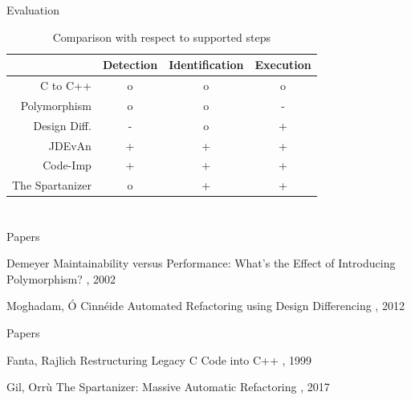 \documentclass{beamer}
\begin{document}
\begin{frame}{Evaluation}
  \begin{table}[htb]
    \centering
    \caption{Comparison with respect to supported steps}
    \label{tbl:steps}
    \begin{tabular}{r|ccc}
      ~               & Detection & Identification  & Execution \\ \hline
      C to C++        & o         & o               & o \\
      Polymorphism    & o         & o               & - \\
      Design Diff.    & -         & o               & + \\
      JDEvAn          & +         & +               & + \\
      Code-Imp        & +         & +               & + \\
      The Spartanizer & o         & +               & + \\
    \end{tabular}
  \end{table}
\end{frame}

\appendix
\section*{\appendixname}

\begin{frame}{Papers}
  \begin{thebibliography}{10}
    \beamertemplatearticlebibitems
    
      Demeyer
      \newblock Maintainability versus Performance: What's the Effect of Introducing Polymorphism?
      , 2002
    
      Moghadam, Ó Cinnéide
      \newblock Automated Refactoring using Design Differencing
      , 2012
  \end{thebibliography}
\end{frame}

\begin{frame}{Papers}
  \begin{thebibliography}{10}
    \beamertemplatearticlebibitems
    
      Fanta, Rajlich
      \newblock Restructuring Legacy C Code into C++
      , 1999
    
      Gil, Orrù
      \newblock The Spartanizer: Massive Automatic Refactoring
      , 2017
  \end{thebibliography}
\end{frame}
\end{document}
